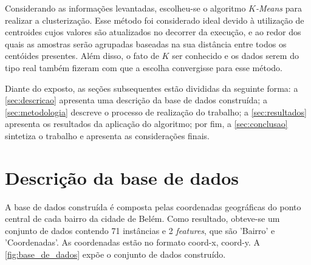 \documentclass[12pt]{article}
\begin{document}
Considerando as informações levantadas, escolheu-se o algoritmo \textit{$K$-Means} para realizar a clusterização. Esse método foi considerado ideal devido à utilização de centroides cujos valores são atualizados no decorrer da execução, e ao redor dos quais as amostras serão agrupadas baseadas na sua distância entre todos os centóides presentes. Além disso, o fato de $K$ ser conhecido e os dados serem do tipo real também fizeram com que a escolha convergisse para esse método.

Diante do exposto, as seções subsequentes estão divididas da seguinte forma: a \autoref{sec:descricao} apresenta uma descrição da base de dados construída; a \autoref{sec:metodologia} descreve o processo de realização do trabalho; a \autoref{sec:resultados} apresenta os resultados da aplicação do algoritmo; por fim, a \autoref{sec:conclusao} sintetiza o trabalho e apresenta as considerações finais.



\section{Descrição da base de dados} %
\label{sec:descricao}                %



A base de dados construída é composta pelas coordenadas geográficas do ponto central de cada bairro da cidade de Belém. Como resultado, obteve-se um conjunto de dados contendo 71 instâncias e 2 \textit{features}, que são 'Bairro' e 'Coordenadas'. As coordenadas estão no formato coord-x, coord-y. A \autoref{fig:base_de_dados} expõe o conjunto de dados construído.
\end{document}
